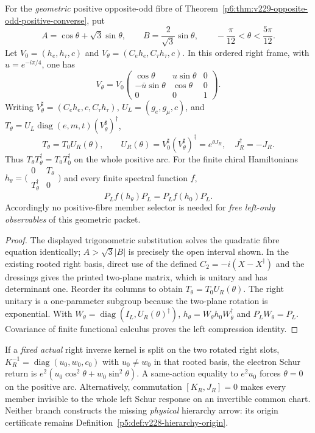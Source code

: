 \documentclass[12pt,a4paper]{article}
\begin{document}
\begin{corollary}
\label{p6:cor:v267-positive-right-unitary-orbit}
For the \emph{geometric} positive opposite-odd fibre of
Theorem~\ref{p6:thm:v229-opposite-odd-positive-converse}, put
\[
 A=\cos\theta+\sqrt3\sin\theta,\qquad
 B=\frac{2}{\sqrt3}\sin\theta,\qquad
 -\frac\pi{12}<\theta<\frac{5\pi}{12}.
\]
Let $V_0=(h_e,h_\tau,c)$ and $V_\theta=(C_eh_e,C_\tau h_\tau,c)$.
In this ordered right frame, with $u=e^{-i\pi/4}$, one has
\[
 \boxed{V_\theta=V_0
 \begin{pmatrix}
 \cos\theta&u\sin\theta&0\\
 -\bar u\sin\theta&\cos\theta&0\\
 0&0&1
 \end{pmatrix}.}
\]
Writing $V_\theta^\sharp=(C_eh_e,c,C_\tau h_\tau)$,
$U_L=(g_e,g_\mu,c)$, and
$T_\theta=U_L\operatorname{diag}(e,m,t)(V_\theta^\sharp)^\dagger$,
\[
 \boxed{T_\theta=T_0U_R(\theta),\qquad
 U_R(\theta)=V_0^\sharp(V_\theta^\sharp)^\dagger
 =e^{\theta J_R},\quad J_R^\dagger=-J_R.}
\]
Thus $T_\theta T_\theta^\dagger=T_0T_0^\dagger$ on the whole
positive arc.  For the finite chiral Hamiltonians
$h_\theta=\bigl(\begin{smallmatrix}0&T_\theta\\
 T_\theta^\dagger&0\end{smallmatrix}\bigr)$ and every finite
spectral function $f$,
\[
 \boxed{P_Lf(h_\theta)P_L=P_Lf(h_0)P_L.}
\]
Accordingly no positive-fibre member selector is needed for
\emph{free left-only observables} of this geometric packet.
\end{corollary}
\begin{proof}
The displayed trigonometric substitution solves the quadratic fibre
equation identically; $A>\sqrt3|B|$ is precisely the open interval
shown. In the existing rooted right basis, direct use of the defined
$C_2=-i(X-X^\dagger)$ and the dressings gives the printed two-plane
matrix, which is unitary and has determinant one.  Reorder its columns
to obtain $T_\theta=T_0U_R(\theta)$.  The right unitary is a one-parameter
subgroup because the two-plane rotation is exponential.
With $W_\theta=\operatorname{diag}(I_L,U_R(\theta)^\dagger)$,
$h_\theta=W_\theta h_0W_\theta^\dagger$ and
$P_LW_\theta=P_L$.  Covariance of finite functional calculus proves
the left compression identity.
\end{proof}
\begin{remark}
\label{p6:rem:v267-positive-orbit-right-mark}
If a \emph{fixed actual} right inverse kernel is split on the two
rotated right slots, $K_R^{-1}=\operatorname{diag}(u_0,w_0,c_0)$
with $u_0\ne w_0$ in that rooted basis, the electron Schur return is
$e^2(u_0\cos^2\theta+w_0\sin^2\theta)$.  A same-action equality
to $e^2u_0$ forces $\theta=0$ on the positive arc.  Alternatively,
commutation $[K_R,J_R]=0$ makes every member invisible to the whole
left Schur response on an invertible common chart.  Neither branch
constructs the missing \emph{physical} hierarchy arrow: its origin
certificate remains Definition~\ref{p5:def:v228-hierarchy-origin}.
\end{remark}
\end{document}
